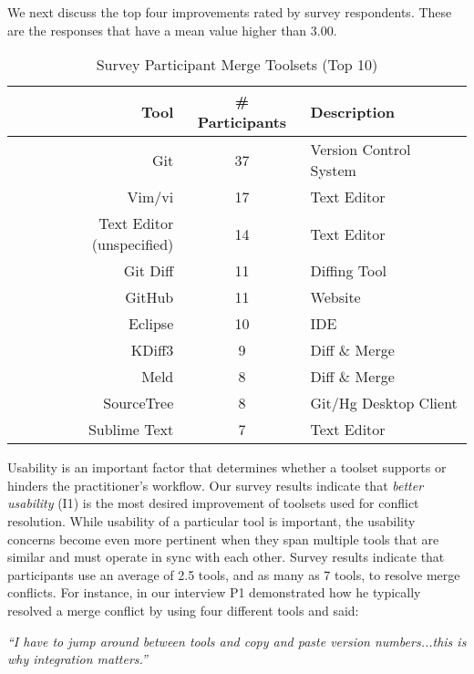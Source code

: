 We next discuss the top four improvements rated by survey respondents. These are the responses that have a mean value higher than $3.00$.

\begin{table}[!htbp]
\renewcommand{\arraystretch}{1.3}
\caption{Survey Participant Merge Toolsets (Top 10)}
\label{survey_toolset}
\centering
\begin{tabularx}{0.45\textwidth}{@{}r|Cl@{}}
\toprule
Tool & \# Participants & Description\\
\midrule
Git	& 37 & Version Control System\\
Vim/vi & 17 & Text Editor\\
Text Editor (unspecified) & 14 & Text Editor\\
Git Diff & 11 & Diffing Tool\\
GitHub & 11 & Website\\
Eclipse & 10 & IDE\\
KDiff3 & 9 & Diff \& Merge\\
Meld & 8 & Diff \& Merge\\
SourceTree & 8 & Git/Hg Desktop Client\\
Sublime Text & 7 & Text Editor\\
\bottomrule
\end{tabularx}
\end{table}

Usability is an important factor that determines whether a toolset supports or hinders the practitioner's workflow.
Our survey results indicate that \textit{better usability} (I1) is the most desired improvement of toolsets used for conflict resolution. 
While usability of a particular tool is important, the usability concerns become even more pertinent when they span multiple tools that are similar and must operate in sync with each other.
Survey results indicate that participants use an average of 2.5 tools, and as many as 7 tools, to resolve merge conflicts.
For instance, in our interview P1 demonstrated how he typically resolved a merge conflict by using four different tools and said: 
\begin{displayquote}
\textit{``I have to jump around between tools and copy and paste version numbers...this is why integration matters.''}
\end{displayquote}

